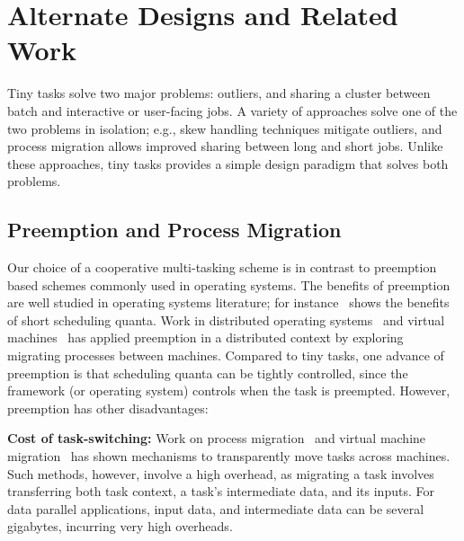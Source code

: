 \section{Alternate Designs and Related Work}
\label{sec:alternate}

Tiny tasks solve two major problems: outliers, and sharing
a cluster between batch and interactive or user-facing jobs. A variety of
approaches solve one of the two problems in isolation; e.g., skew handling
techniques mitigate outliers, and process migration allows improved
sharing between long and short jobs.  Unlike these approaches, tiny tasks
provides a simple design paradigm that solves both problems.

\subsection{Preemption and Process Migration}

Our choice of a cooperative multi-tasking scheme is in contrast to
preemption based schemes commonly used in operating systems. 
The benefits of
preemption are well studied in operating
systems literature; for instance~\cite{sherman1972trace} shows the benefits
of short scheduling quanta. Work in distributed
operating systems~\cite{douglis1991transparent,milojivcic2000process,rozier1991overview} and virtual machines~\cite{tanenbaum1990experiences}
has applied preemption in a distributed context by exploring migrating
processes between machines.
Compared to tiny tasks, one advance of preemption is that scheduling quanta
can be tightly controlled, since the framework (or operating system) controls
when the task is preempted. However, preemption has other disadvantages:

\vspace{4pt}\noindent\textbf{Cost of task-switching:}
Work on process
migration~\cite{douglis1991transparent,milojivcic2000process} and virtual
machine migration~\cite{clark2005live} has shown mechanisms to transparently
move tasks across machines. Such methods, however, involve a high overhead, as
migrating a task involves transferring both task context, a task's intermediate
data, and its inputs. For data parallel applications, input data, and intermediate
data can be several gigabytes, incurring very high overheads.

